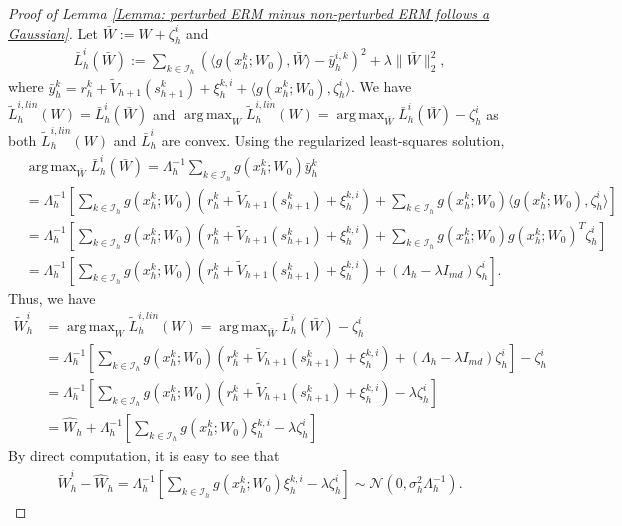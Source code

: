 \documentclass{article} \usepackage{iclr2023/iclr2023_conference,times}
\DeclareMathOperator*{\argmax}{arg\,max}
\begin{document}
\begin{proof}[Proof of Lemma \ref{Lemma: perturbed ERM minus non-perturbed ERM follows a Gaussian}]
Let $\bar{W} := W + \zeta^i_h$ and 
\begin{align*}
    \bar{L}^{i}_h(\bar{W}) := \sum_{k \in \mathcal{I}_h} \left(\langle g(x^k_h; W_0), \bar{W} \rangle - \bar{y}^{i,k}_h \right)^2 + \lambda \| \bar{W}  \|_2^2, 
\end{align*}
where  $\bar{y}^k_h = r^k_h + \tilde{V}_{h+1}(s^k_{h+1}) + \xi^{k,i}_h + \langle g(x^k_h; W_0), \zeta^i_h \rangle$. 
We have $\tilde{L}_h^{i,lin}(W) = \bar{L}_h^{i}(\bar{W})$
and $\argmax_{W} \tilde{L}_h^{i,lin}(W)  = \argmax_{\bar{W}} \bar{L}^i_h(\bar{W}) - \zeta^i_h$ as both $\tilde{L}_h^{i,lin}(W)$ and $\bar{L}^i_h$ are convex. Using the regularized least-squares solution,  
\begin{align*}
     &\argmax_{\bar{W}} \bar{L}_h^i(\bar{W}) = \Lambda_h^{-1} \sum_{k \in \mathcal{I}_h} g(x^k_h; W_0) \bar{y}^k_h \\ 
     &= \Lambda_h^{-1} \left[ \sum_{k \in \mathcal{I}_h}  g(x^k_h; W_0) (r^k_h + \tilde{V}_{h+1}(s^k_{h+1}) + \xi^{k,i}_h ) + \sum_{k \in \mathcal{I}_h}  g(x^k_h; W_0) \langle  g(x^k_h; W_0), \zeta^i_h \rangle \right] \\
     &= \Lambda_h^{-1} \left[ \sum_{k \in \mathcal{I}_h}  g(x^k_h; W_0) (r^k_h + \tilde{V}_{h+1}(s^k_{h+1}) + \xi^{k,i}_h ) + \sum_{k \in \mathcal{I}_h}  g(x^k_h; W_0)  g(x^k_h; W_0)^T \zeta^i_h  \right] \\ 
     &= \Lambda_h^{-1} \left[ \sum_{k \in \mathcal{I}_h}  g(x^k_h; W_0) (r^k_h + \tilde{V}_{h+1}(s^k_{h+1}) + \xi^{k,i}_h ) + (\Lambda_h - \lambda I_{md}) \zeta^i_h  \right]. 
\end{align*}
Thus, we have
\begin{align*}
    \tilde{W}^i_h &= \argmax_{W} \tilde{L}_h^{i,lin}(W) = \argmax_{\bar{W}} \bar{L}^i_h(\bar{W}) - \zeta^i_h \\
    &=  \Lambda_h^{-1} \left[ \sum_{k \in \mathcal{I}_h} g(x^k_h; W_0) (r^k_h + \tilde{V}_{h+1}(s^k_{h+1}) + \xi^{k,i}_h ) + (\Lambda_h - \lambda I_{md}) \zeta^i_h  \right] - \zeta^i_h \\
    &= \Lambda_h^{-1} \left[ \sum_{k \in \mathcal{I}_h} g(x^k_h; W_0) (r^k_h + \tilde{V}_{h+1}(s^k_{h+1}) + \xi^{k,i}_h )  - \lambda  \zeta^i_h  \right] \\
    &= \hat{W}_h + \Lambda^{-1}_h \left[ \sum_{k \in \mathcal{I}_h} g(x^k_h; W_0) \xi^{k,i}_h - \lambda \zeta^i_h \right]
\end{align*}
By direct computation, it is easy to see that 
\begin{align*}
    \tilde{W}^i_h - \hat{W}_h =  \Lambda^{-1}_h \left[ \sum_{k \in \mathcal{I}_h} g(x^k_h; W_0) \xi^{k,i}_h - \lambda \zeta^i_h \right] \sim \mathcal{N}(0, \sigma_h^2 \Lambda_h^{-1}). 
\end{align*}

\end{proof}
\end{document}

